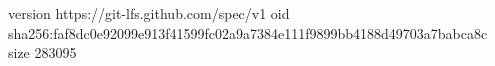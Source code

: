 version https://git-lfs.github.com/spec/v1
oid sha256:faf8dc0e92099e913f41599fc02a9a7384e111f9899bb4188d49703a7babca8c
size 283095
